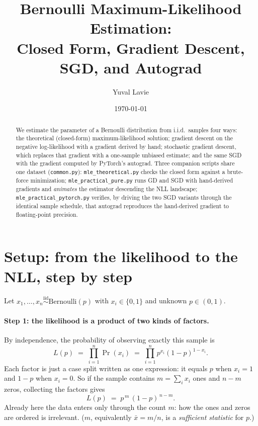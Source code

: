 \documentclass[11pt]{article}
\title{Bernoulli Maximum-Likelihood Estimation:\\
Closed Form, Gradient Descent, SGD, and Autograd}
\author{Yuval Lavie}
\date{\today}
\newcommand{\xbar}{\bar{x}}
\begin{document}
\maketitle

\begin{abstract}
We estimate the parameter of a Bernoulli distribution from i.i.d.\ samples
four ways: the theoretical (closed-form) maximum-likelihood solution;
gradient descent on the negative log-likelihood with a gradient derived by
hand; stochastic gradient descent, which replaces that gradient with a
one-sample unbiased estimate; and the same SGD with the gradient computed
by PyTorch's autograd. Three companion scripts share one dataset
(\texttt{common.py}): \texttt{mle\_theoretical.py} checks the closed form
against a brute-force minimization; \texttt{mle\_practical\_pure.py} runs
GD and SGD with hand-derived gradients and \emph{animates} the estimator
descending the NLL landscape; \texttt{mle\_practical\_pytorch.py} verifies,
by driving the two SGD variants through the identical sample schedule,
that autograd reproduces the hand-derived gradient to floating-point
precision.
\end{abstract}

\section{Setup: from the likelihood to the NLL, step by step}

Let $x_1,\dots,x_n \overset{\text{iid}}{\sim} \mathrm{Bernoulli}(p)$ with
$x_i \in \{0,1\}$ and unknown $p \in (0,1)$.

\paragraph{Step 1: the likelihood is a product of two kinds of factors.}
By independence, the probability of observing exactly this sample is
\begin{equation}
  L(p) \;=\; \prod_{i=1}^{n} \Pr(x_i)
       \;=\; \prod_{i=1}^{n} p^{x_i}(1-p)^{1-x_i}.
\end{equation}
Each factor is just a case split written as one expression: it equals $p$
when $x_i = 1$ and $1-p$ when $x_i = 0$. So if the sample contains
$m = \sum_i x_i$ ones and $n - m$ zeros, collecting the factors gives
\begin{equation}
  L(p) \;=\; p^{\,m}\,(1-p)^{\,n-m}.
  \label{eq:likelihood}
\end{equation}
Already here the data enters only through the count $m$: how the ones and
zeros are ordered is irrelevant. ($m$, equivalently $\xbar = m/n$, is a
\emph{sufficient statistic} for $p$.)
\end{document}
